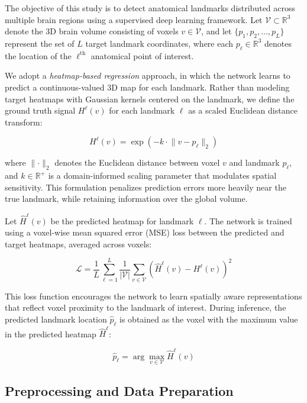 The objective of this study is to detect anatomical landmarks distributed across multiple brain regions using a supervised deep learning framework. Let $\mathcal{V} \subset \mathbb{R}^3$ denote the 3D brain volume consisting of voxels $v \in \mathcal{V}$, and let $\{p_1, p_2, \ldots, p_L\}$ represent the set of $L$ target landmark coordinates, where each $p_\ell \in \mathbb{R}^3$ denotes the location of the $\ell^{\text{th}}$ anatomical point of interest.

We adopt a \textit{heatmap-based regression} approach, in which the network learns to predict a continuous-valued 3D map for each landmark. Rather than modeling target heatmaps with Gaussian kernels centered on the landmark, we define the ground truth signal $H^\ell(v)$ for each landmark $\ell$ as a scaled Euclidean distance transform:

\begin{equation}
H^\ell(v) = \exp\left(-k \cdot \lVert v - p_\ell \rVert_2 \right)
\end{equation}

where $\lVert \cdot \rVert_2$ denotes the Euclidean distance between voxel $v$ and landmark $p_\ell$, and $k \in \mathbb{R}^+$ is a domain-informed scaling parameter that modulates spatial sensitivity. This formulation penalizes prediction errors more heavily near the true landmark, while retaining information over the global volume.

Let $\hat{H}^\ell(v)$ be the predicted heatmap for landmark $\ell$. The network is trained using a voxel-wise mean squared error (MSE) loss between the predicted and target heatmaps, averaged across voxels:

\begin{equation}
\mathcal{L} = \frac{1}{L} \sum_{\ell=1}^L \frac{1}{|\mathcal{V}|} \sum_{v \in \mathcal{V}} \left( \hat{H}^\ell(v) - H^\ell(v) \right)^2
\end{equation}

This loss function encourages the network to learn spatially aware representations that reflect voxel proximity to the landmark of interest. During inference, the predicted landmark location $\hat{p}_\ell$ is obtained as the voxel with the maximum value in the predicted heatmap $\hat{H}^\ell$:

\begin{equation}
\hat{p}_\ell = \arg\max_{v \in \mathcal{V}} \hat{H}^\ell(v)
\end{equation}

\subsection{Preprocessing and Data Preparation}

